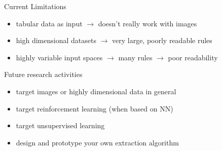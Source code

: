 \documentclass[presentation]{beamer}\mode<presentation>{\usetheme{AMSBolognaFC}}
\begin{document}
\begin{frame}{Current Limitations}
    \begin{itemize}
        \item tabular data as input $\rightarrow$ doesn't really work with images
        \item high dimensional datasets $\rightarrow$ very large, poorly readable rules
        \item highly variable input spaces $\rightarrow$ many rules $\rightarrow$ poor readability
    \end{itemize}
\end{frame}

\begin{frame}{Future research activities}
    \begin{itemize}
        \item target images or highly dimensional data in general
        \item target reinforcement learning (when based on NN)
        \item target unsupervised learning
        \item design and prototype your own extraction algorithm
    \end{itemize}
\end{frame}

\section*{}

\frame{\titlepage}

\section*{\refname}

\begin{frame}[c,noframenumbering]{\refname}
    \scriptsize
    
    
\end{frame}

\end{document}
